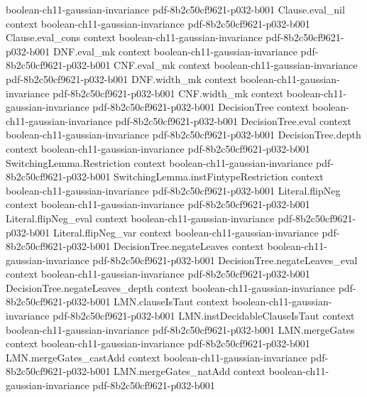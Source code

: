 \begin{lemma}
  {boolean-ch11-gaussian-invariance}
  {pdf-8b2c50cf9621-p032-b001}
\proofstep
  {Clause.eval_nil}
  {context}
  {boolean-ch11-gaussian-invariance}
  {pdf-8b2c50cf9621-p032-b001}
\proofstep
  {Clause.eval_cons}
  {context}
  {boolean-ch11-gaussian-invariance}
  {pdf-8b2c50cf9621-p032-b001}
\proofstep
  {DNF.eval_mk}
  {context}
  {boolean-ch11-gaussian-invariance}
  {pdf-8b2c50cf9621-p032-b001}
\proofstep
  {CNF.eval_mk}
  {context}
  {boolean-ch11-gaussian-invariance}
  {pdf-8b2c50cf9621-p032-b001}
\proofstep
  {DNF.width_mk}
  {context}
  {boolean-ch11-gaussian-invariance}
  {pdf-8b2c50cf9621-p032-b001}
\proofstep
  {CNF.width_mk}
  {context}
  {boolean-ch11-gaussian-invariance}
  {pdf-8b2c50cf9621-p032-b001}
\proofstep
  {DecisionTree}
  {context}
  {boolean-ch11-gaussian-invariance}
  {pdf-8b2c50cf9621-p032-b001}
\proofstep
  {DecisionTree.eval}
  {context}
  {boolean-ch11-gaussian-invariance}
  {pdf-8b2c50cf9621-p032-b001}
\proofstep
  {DecisionTree.depth}
  {context}
  {boolean-ch11-gaussian-invariance}
  {pdf-8b2c50cf9621-p032-b001}
\proofstep
  {SwitchingLemma.Restriction}
  {context}
  {boolean-ch11-gaussian-invariance}
  {pdf-8b2c50cf9621-p032-b001}
\proofstep
  {SwitchingLemma.instFintypeRestriction}
  {context}
  {boolean-ch11-gaussian-invariance}
  {pdf-8b2c50cf9621-p032-b001}
\proofstep
  {Literal.flipNeg}
  {context}
  {boolean-ch11-gaussian-invariance}
  {pdf-8b2c50cf9621-p032-b001}
\proofstep
  {Literal.flipNeg_eval}
  {context}
  {boolean-ch11-gaussian-invariance}
  {pdf-8b2c50cf9621-p032-b001}
\proofstep
  {Literal.flipNeg_var}
  {context}
  {boolean-ch11-gaussian-invariance}
  {pdf-8b2c50cf9621-p032-b001}
\proofstep
  {DecisionTree.negateLeaves}
  {context}
  {boolean-ch11-gaussian-invariance}
  {pdf-8b2c50cf9621-p032-b001}
\proofstep
  {DecisionTree.negateLeaves_eval}
  {context}
  {boolean-ch11-gaussian-invariance}
  {pdf-8b2c50cf9621-p032-b001}
\proofstep
  {DecisionTree.negateLeaves_depth}
  {context}
  {boolean-ch11-gaussian-invariance}
  {pdf-8b2c50cf9621-p032-b001}
\proofstep
  {LMN.clauseIsTaut}
  {context}
  {boolean-ch11-gaussian-invariance}
  {pdf-8b2c50cf9621-p032-b001}
\proofstep
  {LMN.instDecidableClauseIsTaut}
  {context}
  {boolean-ch11-gaussian-invariance}
  {pdf-8b2c50cf9621-p032-b001}
\proofstep
  {LMN.mergeGates}
  {context}
  {boolean-ch11-gaussian-invariance}
  {pdf-8b2c50cf9621-p032-b001}
\proofstep
  {LMN.mergeGates_castAdd}
  {context}
  {boolean-ch11-gaussian-invariance}
  {pdf-8b2c50cf9621-p032-b001}
\proofstep
  {LMN.mergeGates_natAdd}
  {context}
  {boolean-ch11-gaussian-invariance}
  {pdf-8b2c50cf9621-p032-b001}

\end{lemma}
